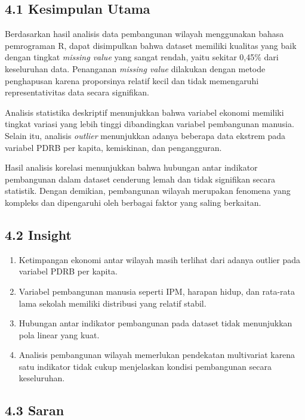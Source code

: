\documentclass[
  12pt,
]{article}
\providecommand{\tightlist}{%
  \setlength{\itemsep}{0pt}\setlength{\parskip}{0pt}}
\begin{document}
\subsection{\texorpdfstring{\normalsize 4.1 \hspace {0,5cm} Kesimpulan
Utama}{4.1  Kesimpulan Utama}}\label{kesimpulan-utama}

Berdasarkan hasil analisis data pembangunan wilayah menggunakan bahasa
pemrograman R, dapat disimpulkan bahwa dataset memiliki kualitas yang
baik dengan tingkat \emph{missing value} yang sangat rendah, yaitu
sekitar 0,45\% dari keseluruhan data. Penanganan \emph{missing value}
dilakukan dengan metode penghapusan karena proporsinya relatif kecil dan
tidak memengaruhi representativitas data secara signifikan.

Analisis statistika deskriptif menunjukkan bahwa variabel ekonomi
memiliki tingkat variasi yang lebih tinggi dibandingkan variabel
pembangunan manusia. Selain itu, analisis \emph{outlier} menunjukkan
adanya beberapa data ekstrem pada variabel PDRB per kapita, kemiskinan,
dan pengangguran.

Hasil analisis korelasi menunjukkan bahwa hubungan antar indikator
pembangunan dalam dataset cenderung lemah dan tidak signifikan secara
statistik. Dengan demikian, pembangunan wilayah merupakan fenomena yang
kompleks dan dipengaruhi oleh berbagai faktor yang saling berkaitan.

\subsection{\texorpdfstring{\normalsize 4.2 \hspace {0,5cm}
Insight}{4.2  Insight}}\label{insight}

\begin{enumerate}
\def\labelenumi{\arabic{enumi}.}
\tightlist
\item
  Ketimpangan ekonomi antar wilayah masih terlihat dari adanya outlier
  pada variabel PDRB per kapita.
\item
  Variabel pembangunan manusia seperti IPM, harapan hidup, dan rata-rata
  lama sekolah memiliki distribusi yang relatif stabil.
\item
  Hubungan antar indikator pembangunan pada dataset tidak menunjukkan
  pola linear yang kuat.
\item
  Analisis pembangunan wilayah memerlukan pendekatan multivariat karena
  satu indikator tidak cukup menjelaskan kondisi pembangunan secara
  keseluruhan.
\end{enumerate}

\subsection{\texorpdfstring{\normalsize 4.3 \hspace {0,5cm}
Saran}{4.3  Saran}}\label{saran}
\end{document}
